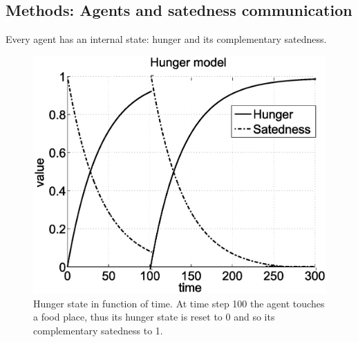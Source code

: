 \subsection{Methods: Agents and satedness communication}
Every agent has an internal state: hunger and its complementary satedness.
\begin{figure}[htbp]
\begin{center}
\includegraphics[scale=0.3]{figures/socialadapt/hungersatshift.eps}
\end{center}
\vspace*{4pt}
\caption[Energy state or hunger of the artificial agent]{
Hunger state in function of time. At time step 100 the agent touches a
food place, thus its hunger state is reset to 0 and so its complementary
satedness to 1. \label{fig:hunger}}
\end{figure}

